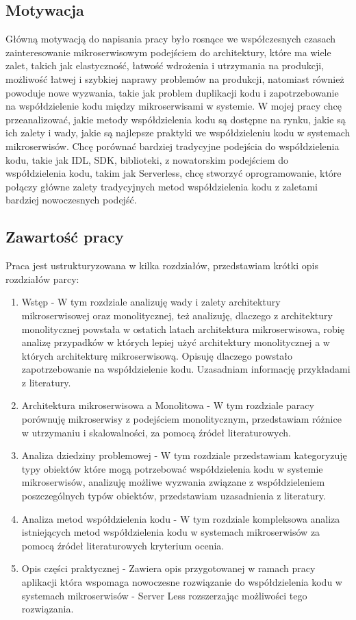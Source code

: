 \documentclass[runningheads,12pt]{llncs}
\begin{document}
\subsection{Motywacja}
Główną motywacją do napisania pracy było rosnące we współczesnych czasach zainteresowanie mikroserwisowym podejściem do architektury, które ma wiele zalet, takich jak elastyczność, łatwość wdrożenia i utrzymania na produkcji, możliwość łatwej i szybkiej naprawy problemów na produkcji, natomiast również powoduje nowe wyzwania, takie jak problem duplikacji kodu i zapotrzebowanie na współdzielenie kodu między mikroserwisami w systemie.
W mojej pracy chcę przeanalizować, jakie metody współdzielenia kodu są dostępne na rynku, jakie są ich zalety i wady, jakie są najlepsze praktyki we współdzieleniu kodu w systemach mikroserwisów. Chcę porównać bardziej tradycyjne podejścia do współdzielenia kodu, takie jak IDL, SDK, biblioteki, z nowatorskim podejściem do współdzielenia kodu, takim jak Serverless, chcę stworzyć oprogramowanie, które połączy główne zalety tradycyjnych metod współdzielenia kodu z zaletami bardziej nowoczesnych podejść.

\newpage

\subsection{Zawartość pracy}
Praca jest ustrukturyzowana w kilka rozdziałów, przedstawiam krótki opis rozdziałów parcy:
\begin{enumerate}
    \item Wstęp - W tym rozdziale analizuję wady i zalety architektury mikroserwisowej oraz monolitycznej, też analizuję, dlaczego z architektury monolitycznej powstała w ostatich latach architektura mikroserwisowa, robię analizę przypadków w których lepiej użyć architektury monolitycznej a w których architekturę mikroserwisową. Opisuję dlaczego powstało zapotrzebowanie na współdzielenie kodu. Uzasadniam informację przykładami z literatury.
    \item Architektura mikroserwisowa a Monolitowa - W tym rozdziale paracy porównuję mikroserwisy z podejściem monolitycznym, przedstawiam różnice w utrzymaniu i skalowalności, za pomocą źródeł literaturowych.
    \item Analiza dziedziny problemowej - W tym rozdziale przedstawiam kategoryzuję typy obiektów które mogą potrzebować współdzielenia kodu w systemie mikroserwisów, analizuję możliwe wyzwania związane z współdzieleniem poszczególnych typów obiektów, przedstawiam uzasadnienia z literatury.
    \item Analiza metod współdzielenia kodu - W tym rozdziale kompleksowa analiza istniejących metod współdzielenia kodu w systemach mikroserwisów za pomocą źródeł literaturowych kryterium ocenia.
    \item Opis części praktycznej - Zawiera opis przygotowanej w ramach pracy aplikacji która wspomaga nowoczesne rozwiązanie do współdzielenia kodu w systemach mikroserwisów - Server Less rozszerzając możliwości tego rozwiązania.
\end{enumerate}
\end{document}

